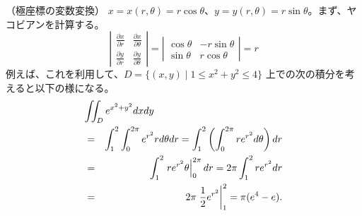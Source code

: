 \begin{eg}
\label{eg:polar2}
（極座標の変数変換）
$x = x(r,\theta) = r\cos\theta$、$y = y(r,\theta) = r\sin\theta$。まず、ヤコビアンを計算する。
$$\left|\begin{array}{cc}\frac{\partial x}{\partial r} & \frac{\partial x}{\partial \theta}
\\ \frac{\partial y}{\partial r} & \frac{\partial y}{\partial \theta}\end{array}\right|
= \left|\begin{array}{cc}\cos\theta & -r\sin\theta
\\ \sin\theta & r\cos\theta\end{array}\right| = r$$
例えば、これを利用して、$D = \{(x,y)\mid 1\leq x^2+y^2 \leq 4\}$ 上での次の積分を考えると以下の様になる。
\begin{eqnarray*}
\lefteqn{\iint_D e^{x^2+y^2}dxdy}\\
& = & \int_1^2\int_0^{2\pi}e^{r^2}rd\theta dr = \int_1^2\left(\int_0^{2\pi}re^{r^2}d\theta\right)dr\\
& = & \int_1^2\left. re^{r^2}\theta\right|_0^{2\pi}dr = 2\pi\int_1^2re^{r^2}dr\\
& = & 2\pi\left.\frac12e^{r^2}\right|_1^2 = \pi(e^4 - e).
\end{eqnarray*}
\end{eg}


